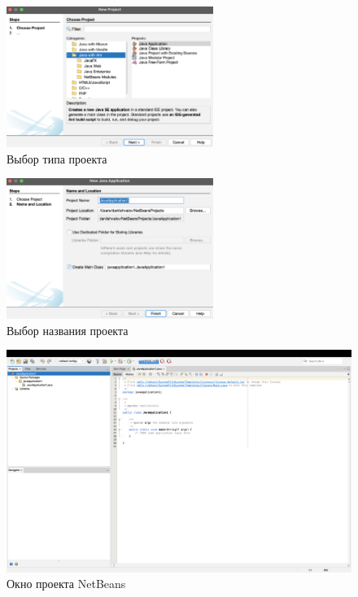 \documentclass[a4paper, 14pt]{extarticle}
\begin{document}
\begin{figure}[H]
  \centering
  \includegraphics[width=0.6\textwidth]{images/task-3/1.png}
  \caption{Выбор типа проекта}
  \label{fig:task-3-1}
\end{figure}

\begin{figure}[H]
  \centering
  \includegraphics[width=0.6\textwidth]{images/task-3/2.png}
  \caption{Выбор названия проекта}
  \label{fig:task-3-2}
\end{figure}

\begin{figure}[H]
  \centering
  \includegraphics[width=\textwidth]{images/task-3/3.png}
  \caption{Окно проекта NetBeans}
  \label{fig:task-3-3}
\end{figure}
\end{document}
